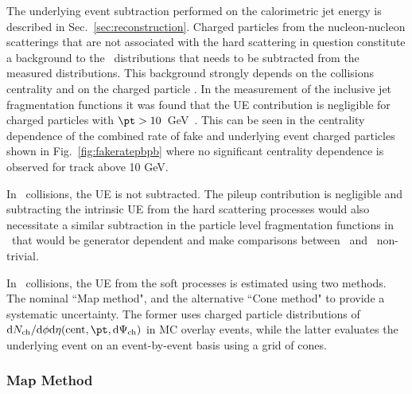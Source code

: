 The underlying event subtraction performed on the calorimetric jet energy is described in Sec.~\ref{sec:reconstruction}. Charged particles from the nucleon-nucleon scatterings that are not associated with the hard scattering in question constitute a background to the \Dptr\ distributions that needs to be subtracted from the measured distributions. This background strongly depends on the collisions centrality and on the charged particle \pt. In the measurement of the inclusive jet fragmentation functions it was found that the UE contribution is negligible for charged particles with $\pt>10$~GeV~\cite{PhysRevC.98.024908}. This can be seen in the centrality dependence of the combined rate of fake and underlying event charged particles shown in Fig.~\ref{fig:fakeratepbpb} where no significant centrality dependence is observed for track above 10 GeV. 

In \pp\ collisions, the UE is not subtracted. The pileup contribution is negligible and subtracting the intrinsic UE from the hard scattering processes would also necessitate a similar subtraction in the particle level fragmentation functions in \pbpb\ that would be generator dependent and make comparisons between \pp\ and \pbpb\ non-trivial.

In \pbpb\ collisions, the UE from the soft processes is estimated using two methods. The nominal ``Map method", and the alternative ``Cone method" to provide a systematic uncertainty. The former uses charged particle distributions of $\mathrm{d}N_{\mathrm{ch}}/\mathrm{d}\phi\mathrm{d}\eta(\mathrm{cent},\pt, \mathrm{d}\Psi_{\mathrm{ch}})$ in MC overlay events, while the latter evaluates the underlying event on an event-by-event basis using a grid of cones. 

\subsubsection{Map Method}
\label{sec:map_method}


